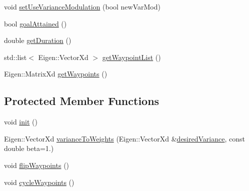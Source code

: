 \begin{DoxyCompactItemize}
\item 
void \hyperlink{classocra__recipes_1_1TrajectoryThread_a230269a0ce3617e924a72b021adb6892}{set\+Use\+Variance\+Modulation} (bool new\+Var\+Mod)
\item 
bool \hyperlink{classocra__recipes_1_1TrajectoryThread_acd000c1ffee3b03d2756b04dba583285}{goal\+Attained} ()
\item 
double \hyperlink{classocra__recipes_1_1TrajectoryThread_ade0f6fb6c7c139dc2f09398f1464200b}{get\+Duration} ()
\item 
std\+::list$<$ Eigen\+::\+Vector\+Xd $>$ \hyperlink{classocra__recipes_1_1TrajectoryThread_a78ac745efb132b69d7129f1e9212ad87}{get\+Waypoint\+List} ()
\item 
Eigen\+::\+Matrix\+Xd \hyperlink{classocra__recipes_1_1TrajectoryThread_ae6830df6ce18f3a6f5656fe345b05731}{get\+Waypoints} ()
\end{DoxyCompactItemize}
\subsection*{Protected Member Functions}
\begin{DoxyCompactItemize}
\item 
void \hyperlink{classocra__recipes_1_1TrajectoryThread_a55a2e93d3706b500338c70d4e1c406ba}{init} ()
\item 
Eigen\+::\+Vector\+Xd \hyperlink{classocra__recipes_1_1TrajectoryThread_a80547ba585263055ad226a386ef18313}{variance\+To\+Weights} (Eigen\+::\+Vector\+Xd \&\hyperlink{classocra__recipes_1_1TrajectoryThread_a86a09c83fbbf2b7a22469a3476204b24}{desired\+Variance}, const double beta=1.)
\item 
void \hyperlink{classocra__recipes_1_1TrajectoryThread_aa7dfe52d95ee048e1e5fbf6ed7a820bd}{flip\+Waypoints} ()
\item 
void \hyperlink{classocra__recipes_1_1TrajectoryThread_a82672124920b0707e3b530d8826ce240}{cycle\+Waypoints} ()
\end{DoxyCompactItemize}
